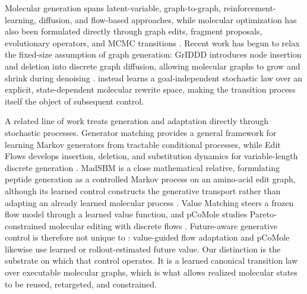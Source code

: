 \label{sec:related}

Molecular generation spans latent-variable, graph-to-graph, reinforcement-learning, diffusion, and flow-based approaches, while molecular optimization has also been formulated directly through graph edits, fragment proposals, evolutionary operators, and MCMC transitions \citep{gomezbombarelli2018chemvae,jin2018jtvae,jin2019vjtnn,zhou2019moldqn,jensen2019graphga,xie2021mars,fu2021mimosa,vignac2023digress,campbell2024multiflow}. Recent work has begun to relax the fixed-size assumption of graph generation: GrIDDD introduces node insertion and deletion into discrete graph diffusion, allowing molecular graphs to grow and shrink during denoising \citep{ninniri2025griddd}. \method{} instead learns a goal-independent stochastic law over an explicit, state-dependent molecular rewrite space, making the transition process itself the object of subsequent control.

A related line of work treats generation and adaptation directly through stochastic processes. Generator matching provides a general framework for learning Markov generators from tractable conditional processes, while Edit Flows develops insertion, deletion, and substitution dynamics for variable-length discrete generation \citep{holderrieth2025generator,havasi2025editflows}. MadSBM is a close mathematical relative, formulating peptide generation as a controlled Markov process on an amino-acid edit graph, although its learned control constructs the generative transport rather than adapting an already learned molecular process \citep{goel2026madsbm}. Value Matching steers a frozen flow model through a learned value function, and pCoMole studies Pareto-constrained molecular editing with discrete flows \citep{jensen2026valuematching,pcomole2026}. Future-aware generative control is therefore not unique to \method{}: value-guided flow adaptation and pCoMole likewise use learned or rollout-estimated future value. Our distinction is the substrate on which that control operates. It is a learned canonical transition law over executable molecular graphs, which is what allows realized molecular states to be reused, retargeted, and constrained.

